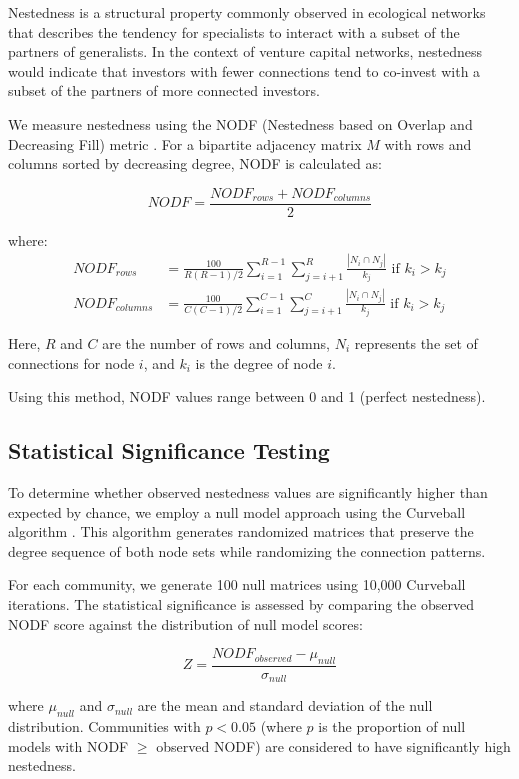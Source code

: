 Nestedness is a structural property commonly observed in ecological networks \cite{AlmeidaNeto2008} that describes the tendency for specialists to interact with a subset of the partners of generalists. In the context of venture capital networks, nestedness would indicate that investors with fewer connections tend to co-invest with a subset of the partners of more connected investors.

We measure nestedness using the NODF (Nestedness based on Overlap and Decreasing Fill) metric \cite{AlmeidaNeto2008}. For a bipartite adjacency matrix $M$ with rows and columns sorted by decreasing degree, NODF is calculated as:

\begin{equation}
NODF = \frac{NODF_{rows} + NODF_{columns}}{2}
\end{equation}

where:
\begin{align}
NODF_{rows} &= \frac{100}{R(R-1)/2} \sum_{i=1}^{R-1} \sum_{j=i+1}^{R} \frac{|N_i \cap N_j|}{k_j} \text{ if } k_i > k_j \\
NODF_{columns} &= \frac{100}{C(C-1)/2} \sum_{i=1}^{C-1} \sum_{j=i+1}^{C} \frac{|N_i \cap N_j|}{k_j} \text{ if } k_i > k_j
\end{align}

Here, $R$ and $C$ are the number of rows and columns, $N_i$ represents the set of connections for node $i$, and $k_i$ is the degree of node $i$.

Using this method, NODF values range between 0 and 1 (perfect nestedness).

\subsection{Statistical Significance Testing}

To determine whether observed nestedness values are significantly higher than expected by chance, we employ a null model approach using the Curveball algorithm \cite{Strona2014}. This algorithm generates randomized matrices that preserve the degree sequence of both node sets while randomizing the connection patterns.

For each community, we generate 100 null matrices using 10,000 Curveball iterations. The statistical significance is assessed by comparing the observed NODF score against the distribution of null model scores:


\begin{equation}
Z = \frac{NODF_{observed} - \mu_{null}}{\sigma_{null}}
\end{equation}

where $\mu_{null}$ and $\sigma_{null}$ are the mean and standard deviation of the null distribution. Communities with $p < 0.05$ (where $p$ is the proportion of null models with NODF $\geq$ observed NODF) are considered to have significantly high nestedness.

